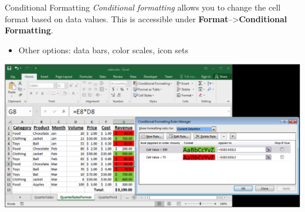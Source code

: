 \documentclass[xcolor=svgnames]{beamer}
\begin{document}
\begin{frame}{Conditional Formatting}
\emph{Conditional formatting} allows you to change the cell format based on data values.  This is accessible under \textbf{Format}-->{\bf Conditional Formatting}.
\begin{itemize}
\item Other options: data bars, color scales, icon sets
\end{itemize}
\hspace*{-6mm}         
\begin{center}                                                  
 \includegraphics[width=.8\textwidth]{CondFormat}
 \end{center}
\end{frame}
\end{document}
